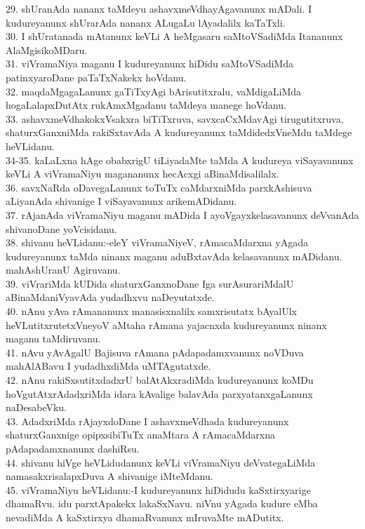\documentclass{article}
\begin{document}
29. shUranAda nananx taMdeyu ashavxmeVdhayAgavanunx mADali. I kudureyanunx shUrarAda nananx ALugaLu lAyadalilx kaTaTxli.\\
30. I shUratanada mAtanunx keVLi A heMgasaru saMtoVSadiMda Itananunx AlaMgisikoMDaru.\\
31. viVramaNiya maganu I kudureyanunx hiDidu saMtoVSadiMda patinxyaroDane paTaTxNakekx hoVdanu.\\
32. maqdaMgagaLanunx gaTiTxyAgi bArisutitxralu, vaMdigaLiMda hogaLalapxDutAtx rukAmxMgadanu taMdeya manege hoVdanu.\\
33. ashavxmeVdhakokxVsakxra biTiTxruva, savxcaCxMdavAgi tirugutitxruva, shaturxGanxniMda rakiSxtavAda A kudureyanunx taMdidedxVneMdu taMdege heVLidanu.\\
34-35. kaLaLxna hAge obabxrigU tiLiyadaMte taMda A kudureya viSayavanunx keVLi A viVramaNiyu magananunx hecAcxgi aBinaMdisalilalx.\\
36. savxNaRda oDavegaLanunx toTuTx caMdarxniMda parxkAshisuva aLiyanAda shivanige I viSayavanunx arikemADidanu.\\
37. rAjanAda viVramaNiyu maganu mADida I ayoVgayxkelasavanunx deVvanAda shivanoDane yoVcisidanu.\\
38. shivanu heVLidanu:-eleY viVramaNiyeV, rAmacaMdarxna yAgada kudureyanunx taMda ninanx maganu aduBxtavAda kelasavanunx mADidanu. mahAshUranU Agiruvanu.\\
39. viVrariMda kUDida shaturxGanxnoDane Iga surAsurariMdalU aBinaMdaniVyavAda yudadhxvu naDeyutatxde.\\
40. nAnu yAva rAmananunx manasisxnalilx samxrisutatx bAyalUlx heVLutitxrutetxVneyoV aMtaha rAmana yajacnxda kudureyanunx ninanx maganu taMdiruvanu.\\
41. nAvu yAvAgalU Bajisuva rAmana pAdapadamxvanunx noVDuva mahAlABavu I yudadhxdiMda uMTAgutatxde.\\
42. nAnu rakiSxsutitxdadxrU balAtAkxradiMda kudureyanunx koMDu hoVgutAtxrAdadxriMda idara kAvalige balavAda parxyatanxgaLanunx naDesabeVku.\\
43. AdadxriMda rAjayxdoDane I ashavxmeVdhada kudureyanunx shaturxGanxnige opipxsibiTuTx anaMtara A rAmacaMdarxna pAdapadamxnanunx dashiRsu.\\
44. shivanu hiVge heVLidudanunx keVLi viVramaNiyu deVvategaLiMda namasakxrisalapxDuva A shivanige iMteMdanu.\\
45. viVramaNiyu heVLidanu:-I kudureyanunx hiDidudu kaSxtirxyarige dhamaRvu. idu parxtApakekx lakaSxNavu. niVnu yAgada kudure eMba nevadiMda A kaSxtirxya dhamaRvanunx mIruvaMte mADutitx.\\
\end{document}

